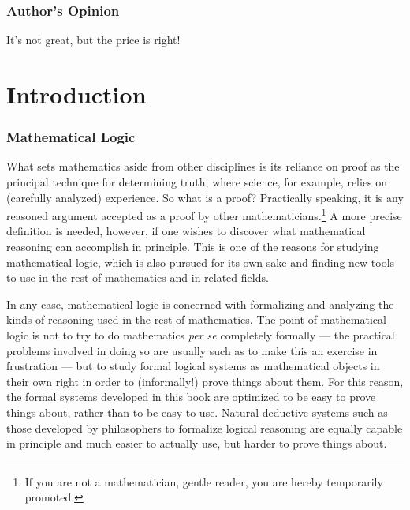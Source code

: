\documentclass[12pt]{amsbook}
\theoremstyle{plain}
\theoremstyle{definition}
\theoremstyle{remark}
\begin{document}
\subsection*{Author's Opinion}
It's not great,  but the price is right!


\mainmatter


%
%

\chapter*{Introduction}

\subsection*{Mathematical Logic}
What sets mathematics aside from other disciplines is its reliance on proof as the principal technique for determining truth,  where science,  for example,  relies on (carefully analyzed) experience.  So what is a proof?  Practically speaking,  it is any reasoned argument accepted as a proof by other mathematicians.\footnote{If you are not a mathematician,  gentle reader,  you are hereby temporarily promoted.}  A more precise definition is needed,  however,  if one wishes to discover what mathematical reasoning can accomplish in principle.  This is one of the reasons for studying mathematical logic,  which is also pursued for its own sake and finding new tools to use in the rest of mathematics and in related fields.

In any case,  mathematical logic   is concerned with formalizing and analyzing the kinds of reasoning used in the rest of mathematics.  The point of mathematical logic is not to try to do mathematics {\em per se\/} completely formally --- the practical problems involved in doing so are usually such as to make this an exercise in frustration --- but to study formal logical systems as mathematical objects in their own right in order to (informally!) prove things about them.  For this reason,  the formal systems developed in this book are optimized to be easy to prove things about,  rather than to be easy to use.  Natural deductive   systems such as those developed by philosophers to formalize logical reasoning are equally capable in principle and much easier to actually use,  but harder to prove things about.
\end{document}
